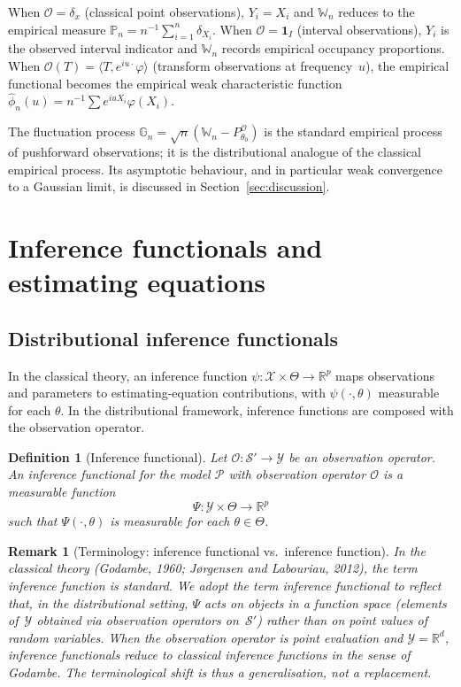 \documentclass[11pt,a4paper]{article}
\newtheorem{definition}[theorem]{Definition}
\newtheorem{remark}[theorem]{Remark}
\newcommand{\R}{\mathbb{R}}
\begin{document}
When $\mathcal O = \delta_x$ (classical point observations),
$Y_i = X_i$ and $\mathbb W_n$ reduces to the empirical measure
$\mathbb P_n = n^{-1}\sum_{i=1}^n \delta_{X_i}$.  When
$\mathcal O = \mathbf{1}_{I}$ (interval observations), $Y_i$ is the
observed interval indicator and $\mathbb W_n$ records empirical
occupancy proportions.  When
$\mathcal O(T) = \langle T, e^{iu\cdot}\varphi \rangle$ (transform
observations at frequency~$u$), the empirical functional becomes the
empirical weak characteristic function
$\hat\phi_n(u) = n^{-1}\sum e^{iuX_i}\varphi(X_i)$.

The fluctuation process
$\mathbb G_n = \sqrt{n}(\mathbb W_n - P_{\theta_0}^{\mathcal O})$
is the standard empirical process of pushforward observations; it is the
distributional analogue of the classical empirical process.  Its
asymptotic behaviour, and in particular weak convergence to a Gaussian
limit, is discussed in Section~\ref{sec:discussion}.


\section{Inference functionals and estimating equations}\label{sec:inference-functionals}

\subsection{Distributional inference functionals}\label{subsec:dist-if}

In the classical theory, an inference function
$\psi : \mathcal X \times \Theta \to \R^p$ maps observations and
parameters to estimating-equation contributions, with $\psi(\cdot, \theta)$
measurable for each $\theta$.  In the distributional framework, inference
functions are composed with the observation operator.

\begin{definition}[Inference functional]\label{def:inference-functional}
Let $\mathcal O : \mathcal S' \to \mathcal Y$ be an observation operator.
An \emph{inference functional} for the model $\mathcal P$ with observation
operator $\mathcal O$ is a measurable function
\[
\Psi : \mathcal Y \times \Theta \to \R^p
\]
such that $\Psi(\cdot, \theta)$ is measurable for each $\theta \in \Theta$.
\end{definition}

\begin{remark}[Terminology: inference functional vs.\ inference function]\label{rem:terminology}
In the classical theory (Godambe, 1960; J{\o}rgensen and Labouriau, 2012),
the term \emph{inference function} is standard.  We adopt the term
\emph{inference functional} to reflect that, in the distributional setting,
$\Psi$ acts on objects in a function space (elements of~$\mathcal Y$
obtained via observation operators on~$\mathcal S'$) rather than on
point values of random variables.  When the observation operator is point
evaluation and $\mathcal Y = \R^d$, inference functionals reduce to
classical inference functions in the sense of Godambe.  The terminological
shift is thus a generalisation, not a replacement.
\end{remark}
\end{document}
